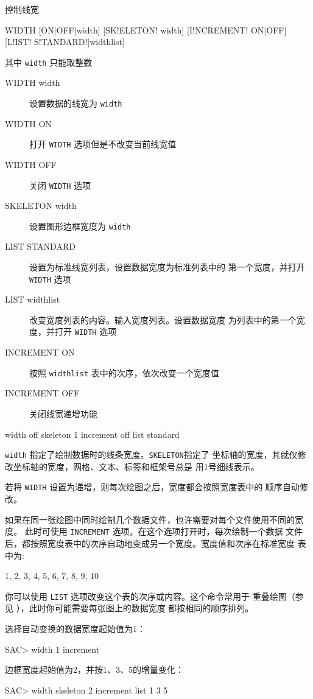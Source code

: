 \label{cmd:width}

控制线宽

\begin{SACSTX}
WIDTH [ON|OFF|width] [SK!ELETON! width] [I!NCREMENT! ON|OFF] [L!IST! S!TANDARD!|widthlist]
\end{SACSTX}
其中 \texttt{width} 只能取整数

\begin{description}
\item [WIDTH width] 设置数据的线宽为 \texttt{width}
\item [WIDTH ON] 打开 \texttt{WIDTH} 选项但是不改变当前线宽值
\item [WIDTH OFF] 关闭 \texttt{WIDTH} 选项
\item [SKELETON width] 设置图形边框宽度为 \texttt{width}
\item [LIST STANDARD] 设置为标准线宽列表，设置数据宽度为标准列表中的
    第一个宽度，并打开 \texttt{WIDTH} 选项
\item [LIST widthlist] 改变宽度列表的内容。输入宽度列表。设置数据宽度
    为列表中的第一个宽度，并打开 \texttt{WIDTH} 选项
\item [INCREMENT ON] 按照 \texttt{widthlist} 表中的次序，依次改变一个宽度值
\item [INCREMENT OFF] 关闭线宽递增功能
\end{description}

\begin{SACDFT}
width off skeleton 1 increment off list standard
\end{SACDFT}

\texttt{width} 指定了绘制数据时的线条宽度。\texttt{SKELETON}指定了
坐标轴的宽度，其就仅修改坐标轴的宽度，网格、文本、标签和框架号总是
用1号细线表示。

若将 \texttt{WIDTH} 设置为递增，则每次绘图之后，宽度都会按照宽度表中的
顺序自动修改。

如果在同一张绘图中同时绘制几个数据文件，也许需要对每个文件使用不同的宽度。
此时可使用 \texttt{INCREMENT} 选项。在这个选项打开时，每次绘制一个数据
文件后，都按照宽度表中的次序自动地变成另一个宽度。宽度值和次序在标准宽度
表中为:
\begin{SACCode}
1, 2, 3, 4, 5, 6, 7, 8, 9, 10
\end{SACCode}
你可以使用 \texttt{LIST} 选项改变这个表的次序或内容。这个命令常用于
重叠绘图（参见 ），此时你可能需要每张图上的数据宽度
都按相同的顺序排列。

选择自动变换的数据宽度起始值为1：
\begin{SACCode}
SAC> width 1 increment
\end{SACCode}

边框宽度起始值为2，并按1、3、5的增量变化：
\begin{SACCode}
SAC> width skeleton 2 increment list 1 3 5
\end{SACCode}
